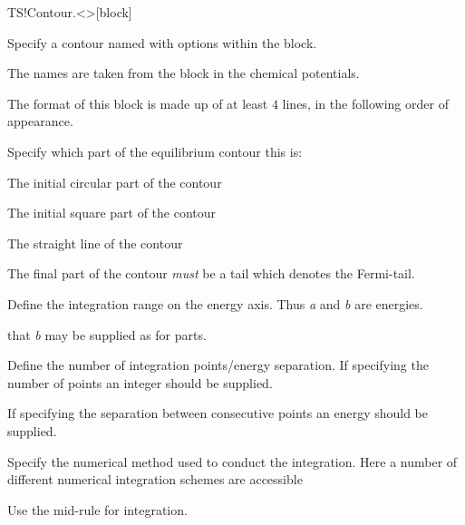 \begin{fdfentry}{TS!Contour.<>}[block]

  Specify a contour named \fdf*{<>} with options within the block.

  The names \fdf*{<>} are taken from the
   block in the chemical potentials.

  The format of this block is made up of at least $4$ lines, in the
  following order of appearance.

  \begin{fdfoptions}

    \option[part]%

    Specify which part of the equilibrium contour this is:
    \begin{fdfoptions}

      \option[circle]%
      The initial circular part of the contour

      \option[square]%
      The initial square part of the contour

      \option[line]%
      The straight line of the contour

      \option[tail]%
      The final part of the contour \emph{must} be a tail which
      denotes the Fermi-tail.

    \end{fdfoptions}


    Define the integration range on the energy axis.
    Thus \emph{a} and \emph{b} are energies.

    \note that \emph{b} may be supplied as  for 
    parts. 


    Define the number of integration points/energy separation.
    If specifying the number of points an integer should be supplied.

    If specifying the separation between consecutive points an energy
    should be supplied.

    \option[method]%

    Specify the numerical method used to conduct the integration. Here
    a number of different numerical integration schemes are accessible

    \begin{fdfoptions}
      Use the mid-rule for integration.


\end{fdfoptions}
\end{fdfoptions}
\end{fdfentry}
